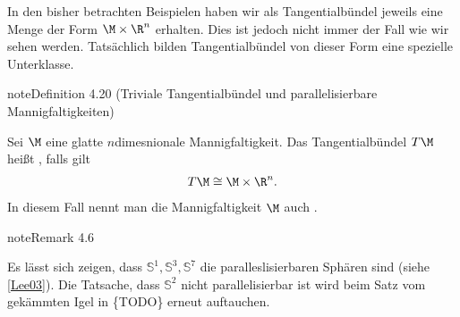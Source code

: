 \documentclass[letterpaper,10pt,english]{jupyterBook}
\begin{document}
\sphinxAtStartPar
In den bisher betrachten Beispielen haben wir als Tangentialbündel jeweils eine Menge der Form \(\M\times \R^n\) erhalten.
Dies ist jedoch nicht immer der Fall wie wir sehen werden.
Tatsächlich bilden Tangentialbündel von dieser Form eine spezielle Unterklasse.
\label{manifolds/tangential:definition-22}
\begin{sphinxadmonition}{note}{Definition 4.20 (Triviale Tangentialbündel und parallelisierbare Mannigfaltigkeiten)}



\sphinxAtStartPar
Sei \(\M\) eine glatte \(n\)\sphinxhyphen{}dimesnionale Mannigfaltigkeit.
Das Tangentialbündel \(T\M\) heißt , falls gilt
\begin{equation*}
\begin{split}T\M\cong \M\times\R^n.\end{split}
\end{equation*}
\sphinxAtStartPar
In diesem Fall nennt man die Mannigfaltigkeit \(\M\) auch .
\end{sphinxadmonition}
\label{manifolds/tangential:remark-23}
\begin{sphinxadmonition}{note}{Remark 4.6}



\sphinxAtStartPar
Es lässt sich zeigen, dass \(\mathbb{S}^1, \mathbb{S}^3,\mathbb{S}^7\) die  paralleslisierbaren Sphären sind (siehe {[}\hyperlink{cite.references:id15}{Lee03}{]}).
Die Tatsache, dass \(\mathbb{S}^2\) nicht parallelisierbar ist wird beim Satz vom gekämmten Igel in \{TODO\} erneut auftauchen.
\end{sphinxadmonition}
\end{document}
